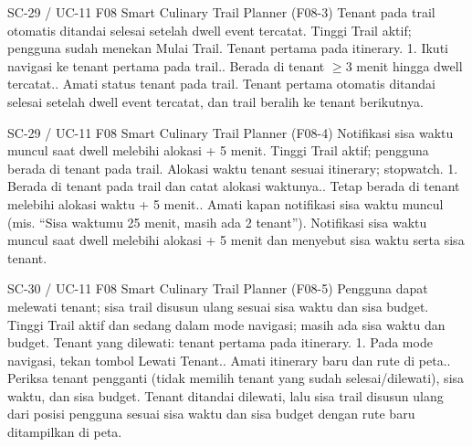 \renewcommand{\tcactual}{Sesuai ekspektasi pada perangkat Android (Lolos via \texttt{progress.test} (17/17) \& \texttt{runtime-trail} (3/3)). Tenant pertama otomatis ditandai selesai setelah dwell event tercatat, dan trail beralih ke tenant berikutnya.}
{SC-29 / UC-11}
{F08 Smart Culinary Trail Planner}
{(F08-3) Tenant pada trail otomatis ditandai selesai setelah dwell event tercatat.}
{Tinggi}
{Trail aktif; pengguna sudah menekan Mulai Trail.}
{Tenant pertama pada itinerary.}
{1. Ikuti navigasi ke tenant pertama pada trail.. Berada di tenant \(\ge\)3 menit hingga dwell tercatat.. Amati status tenant pada trail.}
{Tenant pertama otomatis ditandai selesai setelah dwell event tercatat, dan trail beralih ke tenant berikutnya.}

\renewcommand{\tcactual}{Sesuai ekspektasi pada perangkat Android (Lolos via \texttt{progress.test} (17/17) \& \texttt{runtime-trail} (3/3)). Notifikasi sisa waktu muncul saat dwell melebihi alokasi + 5 menit dan menyebut sisa waktu serta sisa tenant.}
{SC-29 / UC-11}
{F08 Smart Culinary Trail Planner}
{(F08-4) Notifikasi sisa waktu muncul saat dwell melebihi alokasi + 5 menit.}
{Tinggi}
{Trail aktif; pengguna berada di tenant pada trail.}
{Alokasi waktu tenant sesuai itinerary; stopwatch.}
{1. Berada di tenant pada trail dan catat alokasi waktunya.. Tetap berada di tenant melebihi alokasi waktu + 5 menit.. Amati kapan notifikasi sisa waktu muncul (mis. ``Sisa waktumu 25 menit, masih ada 2 tenant'').}
{Notifikasi sisa waktu muncul saat dwell melebihi alokasi + 5 menit dan menyebut sisa waktu serta sisa tenant.}

\renewcommand{\tcactual}{Sesuai ekspektasi pada perangkat Android (Lolos via \texttt{progress.test} (17/17) \& \texttt{06-trail} (8/8)). Tenant ditandai dilewati, lalu sisa trail disusun ulang dari posisi pengguna sesuai sisa waktu dan sisa budget dengan rute baru ditampilkan di peta.}
{SC-30 / UC-11}
{F08 Smart Culinary Trail Planner}
{(F08-5) Pengguna dapat melewati tenant; sisa trail disusun ulang sesuai sisa waktu dan sisa budget.}
{Tinggi}
{Trail aktif dan sedang dalam mode navigasi; masih ada sisa waktu dan budget.}
{Tenant yang dilewati: tenant pertama pada itinerary.}
{1. Pada mode navigasi, tekan tombol Lewati Tenant.. Amati itinerary baru dan rute di peta.. Periksa tenant pengganti (tidak memilih tenant yang sudah selesai/dilewati), sisa waktu, dan sisa budget.}
{Tenant ditandai dilewati, lalu sisa trail disusun ulang dari posisi pengguna sesuai sisa waktu dan sisa budget dengan rute baru ditampilkan di peta.}

